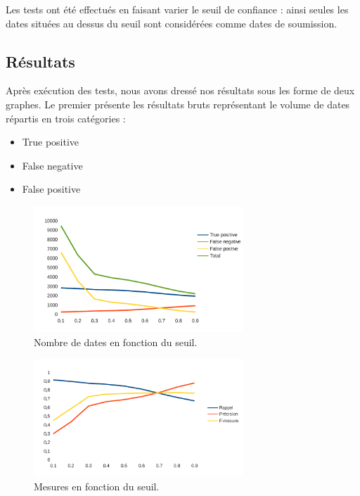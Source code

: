 \documentclass[a4paper,french,10pt]{article}
\begin{document}
Les tests ont été effectués en faisant varier le seuil de confiance : ainsi seules les dates situées au dessus du seuil sont considérées comme dates de soumission.

\subsection{Résultats}

Après exécution des tests, nous avons dressé nos résultats sous les forme de deux graphes. Le premier présente les résultats bruts représentant le volume de dates répartis en trois catégories : 

\begin{itemize}
\item True positive
\item False negative
\item False positive
\end{itemize}

\begin{figure}[H]
\centering
\includegraphics[width=0.7\textwidth]{files/eval_total}
\caption{Nombre de dates en fonction du seuil.}
\label{fig:eval_total}
\end{figure}

\begin{figure}[H]
\centering
\includegraphics[width=0.7\textwidth]{files/eval_mesures}
\caption{Mesures en fonction du seuil.}
\label{fig:eval_mesures}
\end{figure}
\end{document}
